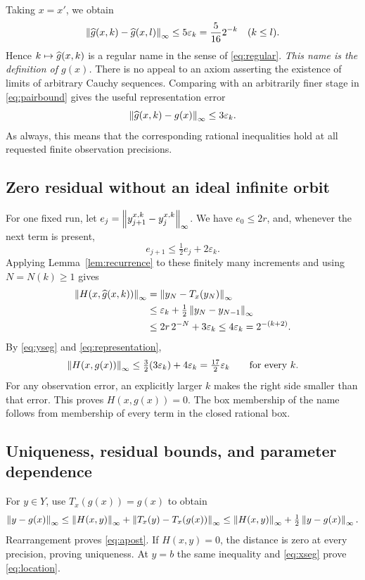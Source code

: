 Taking \(x=x'\), we obtain
\[
 \left\lVert\widehat g(x,k)-\widehat g(x,l)\right\rVert_\infty
 \le5\varepsilon_k=\frac5{16}2^{-k}\quad(k\le l).
\]
Hence \(k\mapsto\widehat g(x,k)\) is a regular name in the sense of
\eqref{eq:regular}. \emph{This name is the definition of \(g(x)\).}
There is no appeal to an axiom asserting the existence of limits
of arbitrary Cauchy sequences. Comparing with an arbitrarily
finer stage in \eqref{eq:pairbound} gives the useful representation
error
\begin{equation}\label{eq:representation}
 \left\lVert\widehat g(x,k)-g(x)\right\rVert_\infty\le3\varepsilon_k.
\end{equation}
As always, this means that the corresponding rational inequalities
hold at all requested finite observation precisions.

\subsection{Zero residual without an ideal infinite orbit}

For one fixed run, let
\(e_j=\left\lVert y_{j+1}^{x,k}-y_j^{x,k}\right\rVert_\infty\).
We have \(e_0\le2r\), and, whenever the next term is present,
\[
 e_{j+1}\le\tfrac12e_j+2\varepsilon_k.
\]
Applying Lemma~\ref{lem:recurrence} to these finitely many
increments and using \(N=N(k)\ge1\) gives
\begin{align}
 \left\lVert H(x,\widehat g(x,k))\right\rVert_\infty
 &=\left\lVert y_N-T_x(y_N)\right\rVert_\infty\nonumber\\
 &\le\varepsilon_k+\tfrac12\left\lVert y_N-y_{N-1}\right\rVert_\infty\nonumber\\
 &\le2r\,2^{-N}+3\varepsilon_k
 \le4\varepsilon_k=2^{-(k+2)}.
 \label{eq:residual}
\end{align}
By \eqref{eq:yseg} and \eqref{eq:representation},
\[
 \left\lVert H(x,g(x))\right\rVert_\infty
 \le \tfrac32(3\varepsilon_k)+4\varepsilon_k
 =\tfrac{17}{2}\varepsilon_k
 \qquad\hbox{for every }k.
\]
For any observation error, an explicitly larger \(k\) makes the
right side smaller than that error. This proves \(H(x,g(x))=0\).
The box membership of the name follows from membership of every
term in the closed rational box.

\subsection{Uniqueness, residual bounds, and parameter dependence}

For \(y\in Y\), use \(T_x(g(x))=g(x)\) to obtain
\[
 \left\lVert y-g(x)\right\rVert_\infty
 \le \left\lVert H(x,y)\right\rVert_\infty+\left\lVert T_x(y)-T_x(g(x))\right\rVert_\infty
 \le \left\lVert H(x,y)\right\rVert_\infty+\tfrac12\left\lVert y-g(x)\right\rVert_\infty.
\]
Rearrangement proves \eqref{eq:apost}. If \(H(x,y)=0\), the
distance is zero at every precision, proving uniqueness. At
\(y=b\) the same inequality and \eqref{eq:xseg} prove
\eqref{eq:location}.

